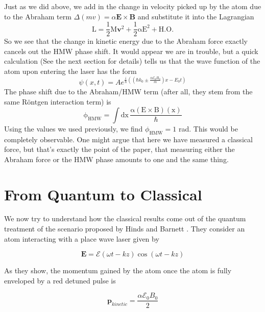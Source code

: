 \documentclass[twocolumn,english,pra,aps,superscriptaddress,floatfix]{revtex4-1}
\begin{document}
Just as we did above, we add in the change in velocity picked up by the atom due to the Abraham term $\Delta(mv)=\alpha\mathbf{E}\times\mathbf{B}$ and substitute it into the Lagrangian
\begin{equation}
\mathrm{L}=\frac{1}{2}\mathrm{M\mathbf{v}^2 +\frac{1}{2}\alpha E^2 +H.O.}
\label{lagrangian4}
\end{equation}
So we see that the change in kinetic energy due to the Abraham force exactly cancels out the HMW phase shift.  It would appear we are in trouble, but a quick calculation (See the next section for details) tells us that the wave function of the atom upon entering the laser has the form
\begin{equation}
\psi(x,t)=Ae^{\frac{i}{\hbar}((\hbar k_0 \pm\frac{\alpha\mathcal{E}_0B_0}{m})x-E_0 t)}
\end{equation}
The phase shift due to the Abraham/HMW term (after all, they stem from the same R\"{o}ntgen interaction term) is
\begin{equation}
\mathrm{\phi_{HMW}=\int dx\,\frac{\alpha (E\times B)(x)}{\hbar}}
\end{equation}
Using the values we used previously, we find $\phi_{\mathrm{HMW}}=1$ rad.  This would be completely observable.  One might argue that here we have measured a classical force, but that's exactly the point of the paper, that measuring either the Abraham force or the HMW phase amounts to one and the same thing.  

\section{From Quantum to Classical}
\label{sec:classical}
We now try to understand how the classical results come out of the quantum treatment of the scenario proposed by Hinds and Barnett \cite{hinds}.  They consider an atom interacting with a place wave laser given by

\begin{equation}
\mathbf{E}=\mathcal{E}(\omega t - kz)\cos{\left(\omega t - kz\right)}
\end{equation}

As they show, the momentum gained by the atom once the atom is fully enveloped by a red detuned pulse is

\begin{equation}
\mathbf{p}_{kinetic}=\frac{\alpha\mathcal{E}_0B_0}{2}
\end{equation}
\end{document}
